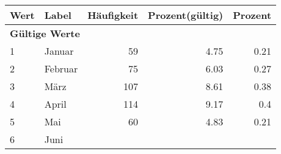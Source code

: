      \begin{longtable}{lXrrr}
     \toprule
     \textbf{Wert} & \textbf{Label} & \textbf{Häufigkeit} & \textbf{Prozent(gültig)} & \textbf{Prozent} \\
     \endhead
     \midrule
     \multicolumn{5}{l}{\textbf{Gültige Werte}}\\

     1 &
     \multicolumn{1}{X}{ Januar   } &


       \num{59} &
       \num[round-mode=places,round-precision=2]{4.75} &
         \num[round-mode=places,round-precision=2]{0.21} \\

     2 &
     \multicolumn{1}{X}{ Februar   } &


       \num{75} &
       \num[round-mode=places,round-precision=2]{6.03} &
         \num[round-mode=places,round-precision=2]{0.27} \\

     3 &
     \multicolumn{1}{X}{ März   } &


       \num{107} &
       \num[round-mode=places,round-precision=2]{8.61} &
         \num[round-mode=places,round-precision=2]{0.38} \\

     4 &
     \multicolumn{1}{X}{ April   } &


       \num{114} &
       \num[round-mode=places,round-precision=2]{9.17} &
         \num[round-mode=places,round-precision=2]{0.4} \\

     5 &
     \multicolumn{1}{X}{ Mai   } &


       \num{60} &
       \num[round-mode=places,round-precision=2]{4.83} &
         \num[round-mode=places,round-precision=2]{0.21} \\

     6 &
     \multicolumn{1}{X}{ Juni   } &



\end{longtable}
